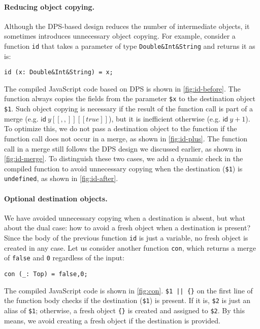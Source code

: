 \paragraph{Reducing object copying.} \label{sec:copy}
Although the DPS-based design reduces the number of intermediate objects, it
sometimes introduces unnecessary object copying. For example, consider a
function \lstinline{id} that takes a parameter of type
\lstinline{Double&Int&String} and returns it as is:
\begin{lstlisting}
id (x: Double&Int&String) = x;
\end{lstlisting}
The compiled JavaScript code based on DPS is shown in \autoref{fig:id-before}.
The function always copies the fields from the parameter \lstinline{$x} to the
destination object \lstinline{$1}. Such object copying is necessary if the
result of the function call is part of a merge (e.g. $\textsf{id}\ y[[,,]][[true]]$),
but it is inefficient otherwise (e.g. $\textsf{id}\ y + 1$). To optimize this,
we do not pass a destination object to the function if the function call does
not occur in a merge, as shown in \autoref{fig:id-plus}. The function call in a
merge still follows the DPS design we discussed earlier, as shown in
\autoref{fig:id-merge}. To distinguish these two cases, we add a dynamic check
in the compiled function to avoid unnecessary copying when the destination
(\lstinline{$1}) is \lstinline{undefined}, as shown in \autoref{fig:id-after}.

\paragraph{Optional destination objects.}
We have avoided unnecessary copying when a destination is absent, but what about
the dual case: how to avoid a fresh object when a destination is present? Since
the body of the previous function \lstinline{id} is just a variable, no fresh
object is created in any case. Let us consider another function \lstinline{con},
which returns a merge of \lstinline{false} and \lstinline{0} regardless of the
input:
\begin{lstlisting}
con (_: Top) = false,0;
\end{lstlisting}
The compiled JavaScript code is shown in \autoref{fig:con}. \lstinline!$1 || {}!
on the first line of the function body checks if the destination
(\lstinline{$1}) is present. If it is, \lstinline{$2} is just an alias of
\lstinline{$1}; otherwise, a fresh object \lstinline|{}| is created and assigned
to \lstinline{$2}. By this means, we avoid creating a fresh object if the
destination is provided.

